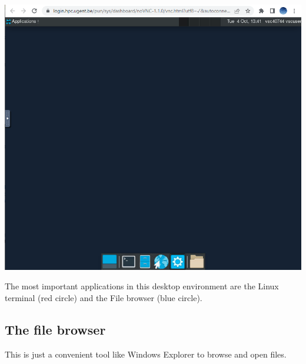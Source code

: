 \documentclass[a4paper]{article}
\begin{document}
\begin{center}
	\includegraphics[scale=.4]{desktop}
\end{center}
%
The most important applications in this desktop environment are the Linux terminal (red circle) and the File browser (blue circle).
%
\subsection{The file browser}
%
\par
This is just a convenient tool like Windows Explorer to browse and open files.
%
\end{document}
